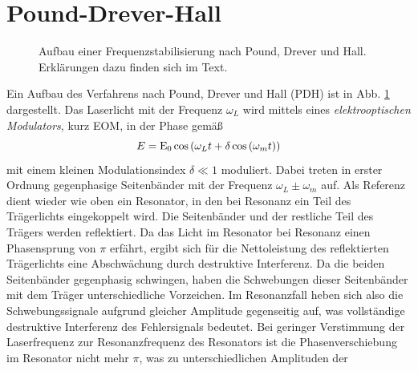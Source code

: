 \section{Pound-Drever-Hall}\label{sec:pound-drever-hall}
\begin{figure}[h]
 	\centering
	\caption[Pound-Drever-Hall-Stabilisierung - Aufbau]{Aufbau
	einer Frequenzstabilisierung nach Pound, Drever und Hall. Erklärungen dazu
	finden sich im Text.}
	\label{fig:pound-drever-hall_aufbau}
\end{figure}
Ein Aufbau des Verfahrens nach Pound, Drever und Hall (PDH) ist in Abb.
\ref{fig:pound-drever-hall_aufbau} dargestellt.
Das Laserlicht mit der Frequenz $\omega_L$ wird mittels eines \textit{elektrooptischen Modulators}, kurz EOM, in der Phase gemäß
\begin{equation}\label{eq:pound-drever-hall_01}
	E=\operatorname{E}_0\cos{\left(\omega_Lt+\delta\cos{(\omega_mt)}\right)}
\end{equation}
mit einem kleinen Modulationsindex $\delta\ll1$ moduliert. Dabei treten in
erster Ordnung gegenphasige Seitenbänder mit der Frequenz $\omega_L\pm\omega_m$
auf. Als Referenz dient wieder wie oben ein Resonator, in den bei Resonanz ein
Teil des Trägerlichts eingekoppelt wird. Die Seitenbänder und der restliche Teil
des Trägers werden reflektiert. Da das Licht im Resonator bei Resonanz einen
Phasensprung von $\pi$ erfährt, ergibt sich für die Nettoleistung des
reflektierten Trägerlichts eine Abschwächung durch destruktive Interferenz.
Da die beiden Seitenbänder gegenphasig schwingen, haben die Schwebungen dieser
Seitenbänder mit dem Träger unterschiedliche Vorzeichen. Im Resonanzfall heben
sich also die Schwebungssignale aufgrund gleicher Amplitude gegenseitig auf, was
vollständige destruktive Interferenz des Fehlersignals bedeutet. Bei geringer
Verstimmung der Laserfrequenz zur Resonanzfrequenz des Resonators ist die
Phasenverschiebung im Resonator nicht mehr $\pi$, was zu unterschiedlichen Amplituden der
